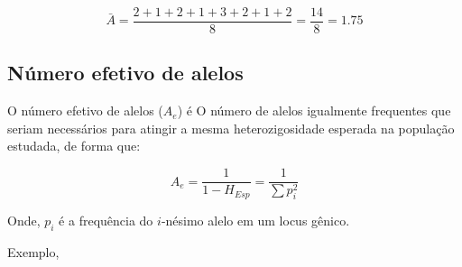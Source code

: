 \documentclass[
]{book}
\begin{document}
\[\bar{A} = \frac{2+1+2+1+3+2+1+2}{8} = \frac{14}{8} = 1.75\]

\hypertarget{nuxfamero-efetivo-de-alelos}{%
\subsection{Número efetivo de alelos}\label{nuxfamero-efetivo-de-alelos}}

O número efetivo de alelos (\(A_e\)) é O número de alelos igualmente frequentes que seriam necessários para atingir a mesma heterozigosidade esperada na população estudada, de forma que:

\begin{equation} 
A_e  =  \frac{1}{1-H_{Esp}}  = \frac{1}{\sum {p_i^2}}
  \label{eq:alelleeffective}
\end{equation}

Onde,
\(p_i\) é a frequência do \(i\)-nésimo alelo em um locus gênico.

Exemplo,
\end{document}
